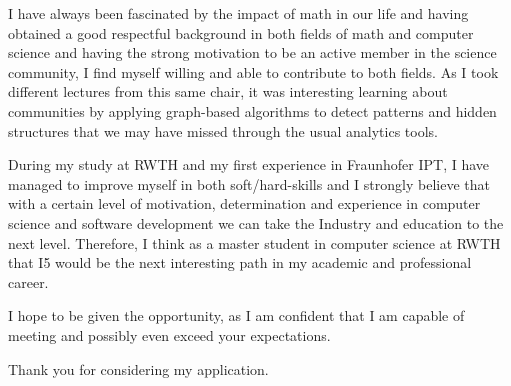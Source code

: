 I have always been fascinated by the impact of math in our life and having obtained a good respectful background in both fields of math and computer science and having the strong motivation to be an active member in the science community, I find myself willing and able to contribute to both fields. As I took different lectures from this same chair, it was interesting learning about communities by applying graph-based algorithms to detect patterns and hidden structures that we may have missed through the usual analytics tools.

During my study at RWTH and my first experience in Fraunhofer IPT, I have managed to improve myself in both soft/hard-skills and I strongly believe that with a certain level of motivation, determination and experience in computer science and software development we can take the
Industry and education to the next level. Therefore, I think as a master student in computer science at RWTH that I5 would be the next interesting path in my academic and professional career.

I hope to be given the opportunity, as I am confident that I am capable of meeting and possibly even exceed your expectations.

Thank you for considering my application.




	{\bfseries \firstname~\familyname}\\
%
\vfill%

